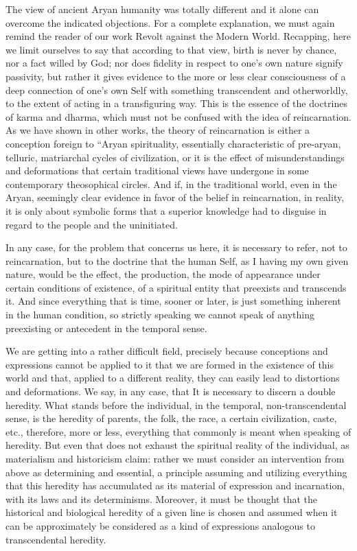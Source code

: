 The view of ancient Aryan humanity was totally different and it alone can overcome the indicated objections. For a complete explanation, we must again remind the reader of our work Revolt against the Modern World. Recapping, here we limit ourselves to say that according to that view, birth is never by chance, nor a fact willed by God; nor does fidelity in respect to one's own nature signify passivity, but rather it gives evidence to the more or less clear consciousness of a deep connection of one's own Self with something transcendent and otherworldly, to the extent of acting in a transfiguring way. This is the essence of the doctrines of karma and dharma, which must not be confused with the idea of reincarnation. As we have shown in other works, the theory of reincarnation is either a conception foreign to ``Aryan spirituality, essentially characteristic of pre-aryan, telluric, matriarchal cycles of civilization, or it is the effect of misunderstandings and deformations that certain traditional views have undergone in some contemporary theosophical circles. And if, in the traditional world, even in the Aryan, seemingly clear evidence in favor of the belief in reincarnation, in reality, it is only about symbolic forms that a superior knowledge had to disguise in regard to the people and the uninitiated.

In any case, for the problem that concerns us here, it is necessary to refer, not to reincarnation, but to the doctrine that the human Self, as I having my own given nature, would be the effect, the production, the mode of appearance under certain conditions of existence, of a spiritual entity that preexists and transcends it. And since everything that is time, sooner or later, is just something inherent in the human condition, so strictly speaking we cannot speak of anything preexisting or antecedent in the temporal sense.

We are getting into a rather difficult field, precisely because conceptions and expressions cannot be applied to it that we are formed in the existence of this world and that, applied to a different reality, they can easily lead to distortions and deformations. We say, in any case, that It is necessary to discern a double heredity. What stands before the individual, in the temporal, non-transcendental sense, is the heredity of parents, the folk, the race, a certain civilization, caste, etc., therefore, more or less, everything that commonly is meant when speaking of heredity. But even that does not exhaust the spiritual reality of the individual, as materialism and historicism claim: rather we must consider an intervention from above as determining and essential, a principle assuming and utilizing everything that this heredity has accumulated as its material of expression and incarnation, with its laws and its determinisms. Moreover, it must be thought that the historical and biological heredity of a given line is chosen and assumed when it can be approximately be considered as a kind of expressions analogous to transcendental heredity.

